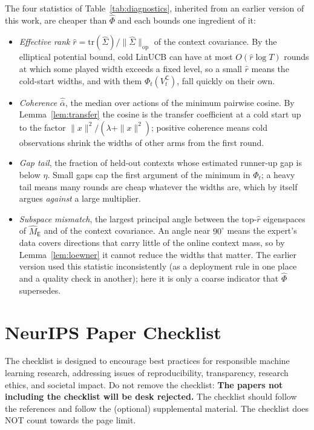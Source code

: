 \documentclass{article}
\theoremstyle{definition}
\theoremstyle{remark}
\theoremstyle{remark}
\newcommand{\Cold}{\mathsf{C}}
\newcommand{\Exp}{\mathsf{E}}
\begin{document}
The four statistics of Table~\ref{tab:diagnostics}, inherited from an earlier
version of this work, are cheaper than $\widehat\Phi$ and each bounds one
ingredient of it:
\begin{itemize}[itemsep=1pt,topsep=1pt,leftmargin=*]
\item \emph{Effective rank} $\widehat r=\mathrm{tr}(\widehat\Sigma)/\|\widehat\Sigma\|_{\mathrm{op}}$
of the context covariance. By the elliptical potential bound, cold LinUCB can
have at most $O(\widehat r\log T)$ rounds at which some played width exceeds
a fixed level, so a small $\widehat r$ means the cold-start widths, and with
them $\Phi_t(V^{\Cold}_t)$, fall quickly on their own.
\item \emph{Coherence} $\widehat{\bar\alpha}$, the median over actions of the
minimum pairwise cosine. By Lemma~\ref{lem:transfer} the cosine is the
transfer coefficient at a cold start up to the factor $\|x\|^2/(\lambda+\|x\|^2)$;
positive coherence means cold observations shrink the widths of other
arms from the first round.
\item \emph{Gap tail}, the fraction of held-out contexts whose estimated
runner-up gap is below $\eta$. Small gaps cap the first argument of the
minimum in $\Phi_t$; a heavy tail means many rounds are cheap whatever the
widths are, which by itself argues \emph{against} a large multiplier.
\item \emph{Subspace mismatch}, the largest principal angle between the
top-$\widehat r$ eigenspaces of $\widehat M_{\Exp}$ and of the context
covariance. An angle near $90^\circ$ means the expert's data covers
directions that carry little of the online context mass, so by
Lemma~\ref{lem:loewner} it cannot reduce the widths that matter. The earlier
version used this statistic inconsistently (as a deployment rule in one place
and a quality check in another); here it is only a coarse indicator that
$\widehat\Phi$ supersedes.
\end{itemize}

\section*{NeurIPS Paper Checklist}

The checklist is designed to encourage best practices for responsible machine learning research, addressing issues of reproducibility, transparency, research ethics, and societal impact. Do not remove the checklist: {\bf The papers not including the checklist will be desk rejected.} The checklist should follow the references and follow the (optional) supplemental material.  The checklist does NOT count towards the page
limit. 
\end{document}
